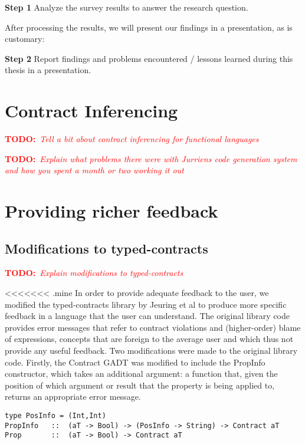 \documentclass[10pt,a4paper]{article}
\newcommand{\annotate}[3]{
	\begin{scriptsize}
	\textcolor{#1}{\textbf{#2}~\textit{#3}}
	\end{scriptsize}\newline}
\newcommand{\todo}[1]{\annotate{red} {TODO:} {#1}}
\begin{document}
\begin{description}
	\item{\textbf{Step 1}} Analyze the survey results to answer the research question.
\end{description}

After processing the results, we will present our findings in a presentation, as is customary:

\begin{description}
	\item{\textbf{Step 2}} Report findings and problems encountered / lessons learned during this thesis in a presentation.
\end{description}

\section{Contract Inferencing}

\todo{Tell a bit about contract inferencing for functional languages}
\todo{Explain what problems there were with Jurriens code generation system and how you spent a month or two working it out}

\section{Providing richer feedback}

\subsection{Modifications to typed-contracts}

\todo{Explain modifications to typed-contracts}

<<<<<<< .mine
In order to provide adequate feedback to the user, we modified the typed-contracts library by Jeuring et al to produce more specific feedback in a language that the user can understand.
The original library code provides error messages that refer to contract violations and (higher-order) blame of expressions, concepts that are foreign to the average user and which thus not provide any useful feedback.
Two modifications were made to the original library code.
Firstly, the Contract GADT was modified to include the PropInfo constructor, which takes an additional argument: a function that, given the position of which argument or result that the property is being applied to, returns an appropriate error message.

\begin{lstlisting}
type PosInfo = (Int,Int)
PropInfo   ::  (aT -> Bool) -> (PosInfo -> String) -> Contract aT
Prop       ::  (aT -> Bool) -> Contract aT
\end{lstlisting}
\end{document}
